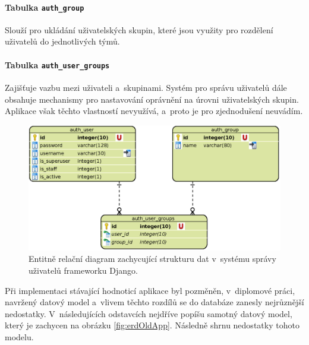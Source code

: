 \documentclass[
  digital,
  twoside,
  table, 
  nolof, 
  nolot
]{fithesis3}
\begin{document}
\paragraph{Tabulka \texttt{auth\_group}} Slouží pro ukládání uživatelských skupin, které jsou využity pro rozdělení uživatelů do jednotlivých týmů. 

\paragraph{Tabulka \texttt{auth\_user\_groups}} Zajišťuje vazbu mezi uživateli a~skupinami. Systém pro správu uživatelů dále obsahuje mechanismy pro nastavování oprávnění na úrovni uživatelských skupin. Aplikace však těchto vlastností nevyužívá, a~proto je pro zjednodušení neuvádím.

\begin{figure}[h!]
    \centering
    \includegraphics[width=12cm]{images/ERD-django.eps}
    \caption{Entitně relační diagram zachycující strukturu dat v~systému správy uživatelů frameworku Django.}
    \label{fig:erdDjango}
\end{figure}

Při implementaci stávající hodnoticí aplikace byl pozměněn, v~diplomové práci, navržený datový model a~vlivem těchto rozdílů se do databáze zanesly nejrůznější nedostatky. V~následujících odstavcích nejdříve popíšu samotný datový model, který je zachycen na obrázku \ref{fig:erdOldApp}. Následně shrnu nedostatky tohoto modelu. 
\end{document}

